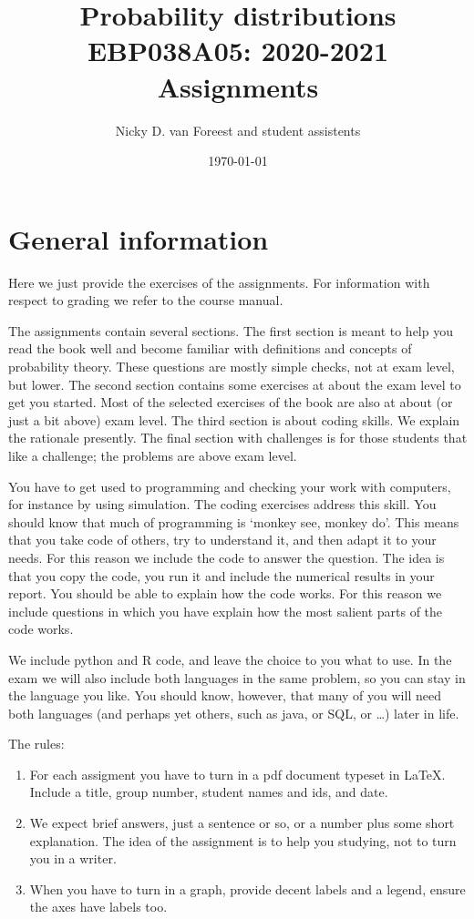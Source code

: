 \documentclass[a4paper]{article}
\author{Nicky D. van Foreest and student assistents}
\date{\today}
\title{Probability distributions EBP038A05: 2020-2021\\
Assignments}
\begin{document}
 

\maketitle


\section*{General information}
\label{sec:orgb865fed}

Here we just provide the exercises of the assignments.  For information with respect to grading we refer to the  course manual.


The assignments contain several sections.
The first section is meant to help you read the book well and become familiar with definitions and concepts of probability theory.
These questions are mostly simple checks, not at exam level, but lower.
The second section contains some exercises at about the exam level to get you started.
Most of the selected exercises of the book are also at about (or just a bit above) exam level.
The third section is about coding skills.
We explain the rationale presently.
The final section with challenges is for those students that like a challenge; the problems are above exam level.


You have to get used to programming and checking your work with computers, for instance by using simulation.
The coding exercises address this skill.
You should know that much of programming is `monkey see, monkey do'.
This means that you take code of others, try to understand it, and then adapt it to your needs.
For this reason we include the code to answer the question.
The idea is that you copy the code, you  run it and include the numerical results in your report. You should be able to explain how the code works. For this reason we include questions in which you have explain how the most salient parts of the code works. 

We include python and R code, and leave the choice to you what to use.
In the exam we will also include both languages in the same problem, so  you can stay in the language you like.
You should know, however, that many of you  will need both languages (and perhaps yet others, such as java, or SQL, or \ldots) later in life. 

The rules: 
\begin{enumerate}
\item For each assigment you have to turn in a pdf document typeset in \LaTeX{}. Include a title, group number, student names and ids, and date.
\item We expect brief answers, just a sentence or so, or a number plus some short explanation. The idea of the assignment is to help you studying, not to turn you in a writer. 
\item When you have to turn in a graph, provide decent labels and a legend, ensure the axes have labels too.
\end{enumerate}









\end{document}
